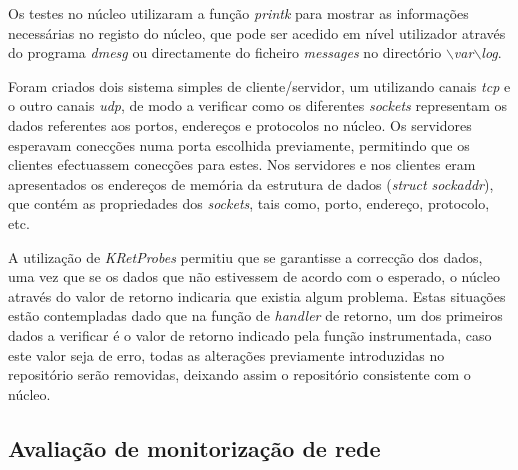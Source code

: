 Os testes no núcleo utilizaram a função \textit{printk} para mostrar as informações necessárias no registo do núcleo, que pode ser acedido em nível utilizador através do programa \textit{dmesg} ou directamente do ficheiro \textit{messages} no directório $\backslash$\textit{var}$\backslash$\textit{log}.

Foram criados dois sistema simples de cliente/servidor, um utilizando canais \textit{tcp} e o outro canais \textit{udp}, de modo a verificar como os diferentes \textit{sockets} representam os dados referentes aos portos, endereços e protocolos no núcleo.
Os servidores esperavam conecções numa porta escolhida previamente, permitindo que os clientes efectuassem conecções para estes.
Nos servidores e nos clientes eram apresentados os endereços de memória da estrutura de dados (\textit{struct sockaddr}), que contém as propriedades dos \textit{sockets}, tais como, porto, endereço, protocolo, etc.

A utilização de \textit{KRetProbes} permitiu que se garantisse a correcção dos dados, uma vez que se os dados que não estivessem de acordo com o esperado, o núcleo através do valor de retorno indicaria que existia algum problema.
Estas situações estão contempladas dado que na função de \textit{handler} de retorno, um dos primeiros dados a verificar é o valor de retorno indicado pela função instrumentada, caso este valor seja de erro, todas as alterações previamente introduzidas no repositório serão removidas, deixando assim o repositório consistente com o núcleo.

\subsection{Avaliação de monitorização de rede}

